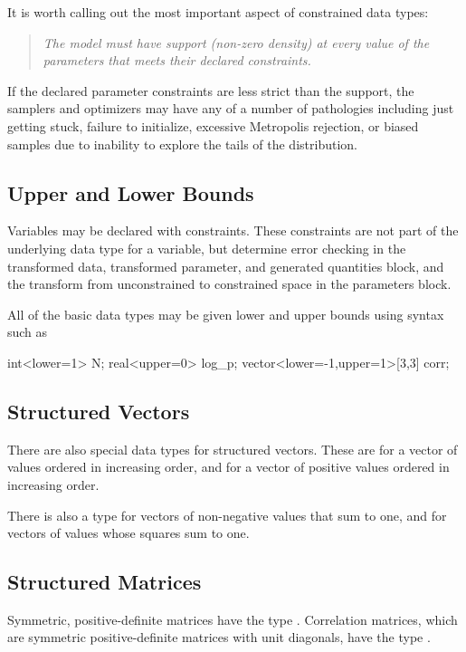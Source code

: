 It is worth calling out the most important aspect of constrained data
types: 
%
\begin{quote}
\it
The model must have support (non-zero density) at every value of the
parameters that meets their declared constraints.
\end{quote}
%
If the declared parameter constraints are less strict than the
support, the samplers and optimizers may have any of a number of
pathologies including just getting stuck, failure to initialize,
excessive Metropolis rejection, or biased samples due to inability to
explore the tails of the distribution.

\subsection{Upper and Lower Bounds}

Variables may be declared with constraints.  These constraints are not
part of the underlying data type for a variable, but determine error
checking in the transformed data, transformed parameter, and generated
quantities block, and the transform from unconstrained to constrained
space in the parameters block.

All of the basic data types may be given lower and upper bounds using
syntax such as
%
\begin{stancode}
int<lower=1> N;
real<upper=0> log_p;
vector<lower=-1,upper=1>[3,3] corr;
\end{stancode}

\subsection{Structured Vectors}

There are also special data types for structured vectors.  These are
 for a vector of values ordered in increasing order, and
 for a vector of positive values ordered in
increasing order.  

There is also a type  for vectors of non-negative values
that sum to one, and  for vectors of values whose
squares sum to one.

\subsection{Structured Matrices}

Symmetric, positive-definite matrices have the type
.  Correlation matrices, which are symmetric
positive-definite matrices with unit diagonals, have the type
.

